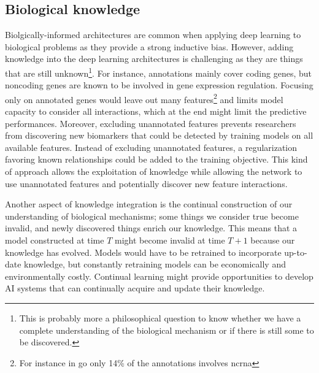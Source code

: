 \documentclass[../main.tex]{subfiles}
\begin{document}
	\subsection{Biological knowledge}\label{sec:persp_knwoledged}
		Biolgically-informed architectures are common when applying deep learning to biological problems as they provide a strong inductive bias.
		However, adding knowledge into the deep learning architectures is challenging as they are things that are still unknown\footnote{This is probably more a philosophical question to know whether we have a complete understanding of the biological mechanism or if there is still some to be discovered.}.
		For instance, annotations mainly cover coding genes, but noncoding genes are known to be involved in gene expression regulation.
		Focusing only on annotated genes would leave out many features\footnote{For instance in \gls{go} only 14\% of the annotations involves \gls{ncrna}} and limits model capacity to consider all interactions, which at the end might limit the predictive performances.
		Moreover, excluding unannotated features prevents researchers from discovering new biomarkers that could be detected by training models on all available features.
		Instead of excluding unannotated features, a regularization favoring known relationships could be added to the training objective.
		This kind of approach allows the exploitation of knowledge while allowing the network to use unannotated features and potentially discover new feature interactions.

		Another aspect of knowledge integration is the continual construction of our understanding of biological mechanisms; some things we consider true become invalid, and newly discovered things enrich our knowledge.
		This means that a model constructed at time \(T\) might become invalid at time \(T+1\) because our knowledge has evolved.
		Models would have to be retrained to incorporate up-to-date knowledge, but constantly retraining models can be economically and environmentally costly.
		Continual learning might provide opportunities to develop AI systems that can continually acquire and update their knowledge\cite{wang2024comprehensivesurveycontinuallearning}.
\end{document}
